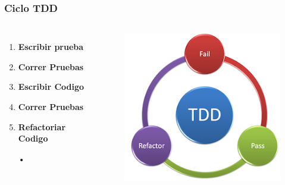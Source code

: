 \documentclass{beamer}
\begin{document}
\begin{frame}
\frametitle{Ciclo TDD}
\begin{columns}[c] %

\begin{enumerate}
\item \textbf{Escribir prueba}
\item {\color{red}\textbf{Correr Pruebas}}
\item \textbf{Escribir Codigo}
\item {\color{green}\textbf{Correr Pruebas}}
\item \textbf{Refactoriar Codigo}
\item[•]	
\end{enumerate}

\begin{figure}
\includegraphics[width=0.9\linewidth]{tdd.png}
\end{figure}
\end{columns}
\end{frame}
\end{document}
